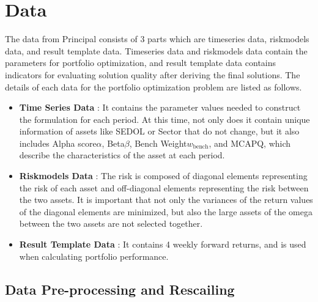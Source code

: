 \documentclass[11pt]{article}
\begin{document}
	
	
	
	
	\section*{Data}
	The data from Principal consists of 3 parts which are timeseries data, riskmodels data, and result template data. Timeseries data and riskmodels data contain the parameters for portfolio optimization, and result template data contains indicators for evaluating solution quality after deriving the final solutions. The details of each data for the portfolio optimization problem are listed as follows. 
	
	\begin{itemize}
		\item \textbf{Time Series Data} : It contains the parameter values needed to construct the formulation for each period. At this time, not only does it contain unique information of assets like SEDOL or Sector that do not change, but it also includes Alpha score$\alpha$, Beta$\beta$, Bench Weight$w_{\text{bench}}$, and MCAPQ, which describe the characteristics of the asset at each period.
		\item \textbf{Riskmodels Data} : The risk is composed of diagonal elements representing the risk of each asset and off-diagonal elements representing the risk between the two assets. It is important that not only the variances of the return values of the diagonal elements are minimized, but also the large assets of the omega between the two assets are not selected together.
		\item \textbf{Result Template Data} : It contains 4 weekly forward returns, and is used when calculating portfolio performance. 
	\end{itemize}
	
	
	\subsection{Data Pre-processing and Rescailing}
	
\end{document}
